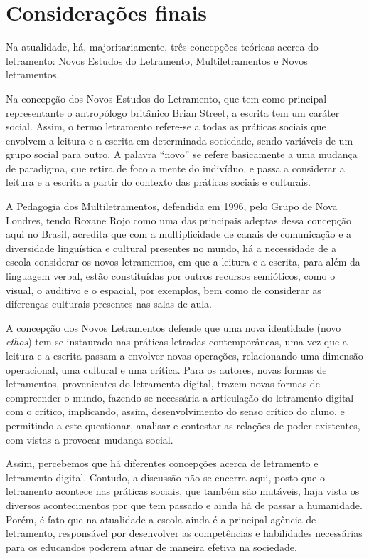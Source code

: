 \documentclass{textolivre}
\begin{document}
\section{Considerações finais}\label{sec-consideracoes-finais}
Na atualidade, há, majoritariamente, três concepções teóricas acerca do
letramento: Novos Estudos do Letramento, Multiletramentos e Novos letramentos.

Na concepção dos Novos Estudos do Letramento, que tem como principal
representante o antropólogo britânico Brian Street, a escrita tem um caráter
social. Assim, o termo letramento refere-se a todas as práticas sociais que
envolvem a leitura e a escrita em determinada sociedade, sendo variáveis de um
grupo social para outro. A palavra “novo” se refere basicamente a uma mudança
de paradigma, que retira de foco a mente do indivíduo, e passa a considerar a
leitura e a escrita a partir do contexto das práticas sociais e culturais.

A Pedagogia dos Multiletramentos, defendida em 1996, pelo Grupo de Nova
Londres, tendo Roxane Rojo como uma das principais adeptas dessa concepção aqui
no Brasil, acredita que com a multiplicidade de canais de comunicação e a
diversidade linguística e cultural presentes no mundo, há a necessidade de a
escola considerar os novos letramentos, em que a leitura e a escrita, para além
da linguagem verbal, estão constituídas por outros recursos semióticos, como o
visual, o auditivo e o espacial, por exemplos, bem como de considerar as
diferenças culturais presentes nas salas de aula.

A concepção dos Novos Letramentos defende que uma nova identidade (novo \emph{ethos})
tem se instaurado nas práticas letradas contemporâneas, uma vez que a leitura e
a escrita passam a envolver novas operações, relacionando uma dimensão
operacional, uma cultural e uma crítica. Para os autores, novas formas de
letramentos, provenientes do letramento digital, trazem novas formas de
compreender o mundo, fazendo-se necessária a articulação do letramento digital
com o crítico, implicando, assim, desenvolvimento do senso crítico do aluno, e
permitindo a este questionar, analisar e contestar as relações de poder
existentes, com vistas a provocar mudança social.

Assim, percebemos que há diferentes concepções acerca de letramento e
letramento digital. Contudo, a discussão não se encerra aqui, posto que o
letramento acontece nas práticas sociais, que também são mutáveis, haja vista
os diversos acontecimentos por que tem passado e ainda há de passar a
humanidade. Porém, é fato que na atualidade a escola ainda é a principal
agência de letramento, responsável por desenvolver as competências e
habilidades necessárias para os educandos poderem atuar de maneira efetiva na
sociedade.

\printbibliography\label{sec-bib}
\end{document}
